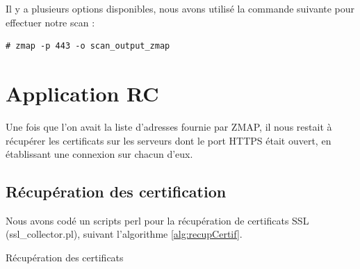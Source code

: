 Il y a plusieurs options disponibles, nous avons utilisé la commande suivante pour effectuer notre scan :
\begin{verbatim}
# zmap -p 443 -o scan_output_zmap
\end{verbatim}

\section{Application RC}

Une fois que l'on avait la liste d'adresses fournie par ZMAP, il nous restait à récupérer les certificats sur les serveurs dont le port HTTPS était ouvert, en établissant une connexion sur chacun d'eux.\\

\subsection{Récupération des certification}

Nous avons codé un scripts perl pour la récupération de certificats SSL (ssl\_collector.pl), suivant l'algorithme \ref{alg:recupCertif}.\\


\begin{algorithm}[H]
\label{alg:recupCertif}
 

\caption{Récupération des certificats} 
\end{algorithm}
\vspace{0.7cm}


